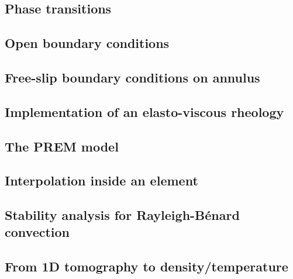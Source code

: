 \subsection{Phase transitions}\label{ss:phasetransitions} %
\newpage %
\subsection{Open boundary conditions}\label{ss:openbc} %
\newpage %
\subsection{Free-slip boundary conditions on annulus}\label{ss:fsbc_annulus} %
\newpage %
\subsection{Implementation of an elasto-viscous rheology} \label{ss:evrheo}  %
\newpage %
\subsection{The PREM model} \label{ss:prem}  %
\newpage %
\subsection{Interpolation inside an element} \label{ss:bern}  %
\newpage %
\subsection{Stability analysis for Rayleigh-B\'enard convection} \label{ss:sarb}  %
\newpage %
\subsection{From 1D tomography to density/temperature}  %
\newpage %

